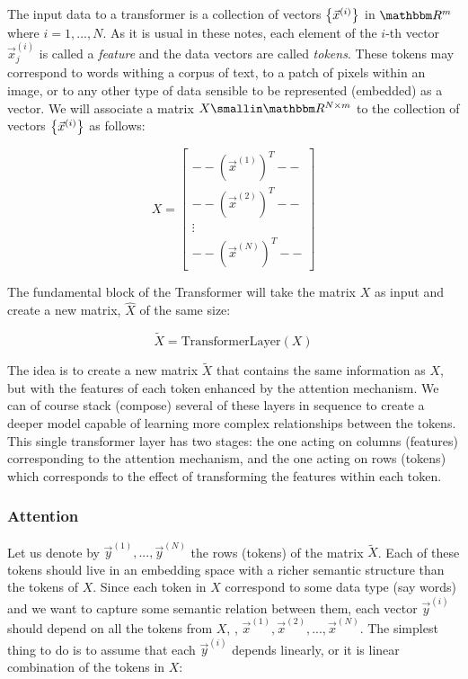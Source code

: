 The input data to a transformer is a collection of vectors $\left\lbrace \vec{x}^{(i)} \right\rbrace$ in $\RR^m$ where ${i=1,...,N}$. As it is usual in these notes, each element of the $i$-th vector $\vec{x}^{(i)}_j$ is called a \emph{feature} and the data vectors are called \emph{tokens}. These tokens may correspond to words withing a corpus of text, to a patch of pixels within an image, or to any other type of data sensible to be represented (embedded) as a vector. We will associate a matrix $X \in \RR^{N \times m}$ to the collection of vectors $\left\lbrace \vec{x}^{(i)} \right\rbrace$ as follows: 

\begin{equation}
    X = \begin{bmatrix}
       -- (\vec{x}^{(1)})^T -- \\
       -- (\vec{x}^{(2)})^T -- \\
        \vdots \\
       -- (\vec{x}^{(N)})^T --
    \end{bmatrix} 
\end{equation}   

The fundamental block of the Transformer will take the matrix $X$ as input and create a new matrix, $\widehat{X}$ of the same size: 

$$
\widetilde{X} = \textrm{TransformerLayer}(X)
$$

The idea is to create a new matrix $\widetilde{X}$ that contains the same information as $X$, but with the features of each token enhanced by the attention mechanism. We can of course stack (compose) several of these layers in sequence to create a deeper model capable of learning more complex relationships between the tokens. This single transformer layer has two stages: the one acting on columns (features) corresponding to the attention mechanism, and the one acting on rows (tokens) which corresponds to the effect of transforming the features within each token. 


\subsubsection*{Attention}

Let us denote by $\vec{y}^{(1)},...,\vec{y}^{(N)}$ the rows (tokens) of the matrix $\widetilde{X}$. Each of these tokens should live in an embedding space with a richer semantic structure than the tokens of $X$. Since each token in $X$ correspond to some data type (say words) and we want to capture some semantic relation between them, each vector $\vec{y}^{(i)}$ should depend on all the tokens from $X$, \ie, $\vec{x}^{(1)}, \vec{x}^{(2)},...,\vec{x}^{(N)}$. The simplest thing to do is to assume that each $\vec{y}^{(i)}$ depends linearly, or it is linear combination of the tokens in $X$: 

